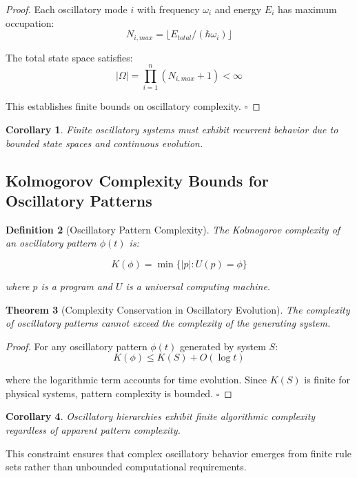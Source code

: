 \documentclass[11pt]{article}
\newtheorem{theorem}{Theorem}[section]
\newtheorem{corollary}[theorem]{Corollary}
\newtheorem{definition}[theorem]{Definition}
\theoremstyle{remark}
\begin{document}
\begin{proof}
Each oscillatory mode $i$ with frequency $\omega_i$ and energy $E_i$ has maximum occupation:
$$N_{i,max} = \lfloor E_{total}/(\hbar\omega_i) \rfloor$$

The total state space satisfies:
$$|\Omega| = \prod_{i=1}^{n} (N_{i,max} + 1) < \infty$$

This establishes finite bounds on oscillatory complexity. $\square$
\end{proof}

\begin{corollary}
Finite oscillatory systems must exhibit recurrent behavior due to bounded state spaces and continuous evolution.
\end{corollary}

\subsection{Kolmogorov Complexity Bounds for Oscillatory Patterns}

\begin{definition}[Oscillatory Pattern Complexity]
The Kolmogorov complexity of an oscillatory pattern $\phi(t)$ is:

$$K(\phi) = \min\{|p| : U(p) = \phi\}$$

where $p$ is a program and $U$ is a universal computing machine.
\end{definition}

\begin{theorem}[Complexity Conservation in Oscillatory Evolution]
The complexity of oscillatory patterns cannot exceed the complexity of the generating system.
\end{theorem}

\begin{proof}
For any oscillatory pattern $\phi(t)$ generated by system $S$:
$$K(\phi) \leq K(S) + O(\log t)$$

where the logarithmic term accounts for time evolution. Since $K(S)$ is finite for physical systems, pattern complexity is bounded. $\square$
\end{proof}

\begin{corollary}
Oscillatory hierarchies exhibit finite algorithmic complexity regardless of apparent pattern complexity.
\end{corollary}

This constraint ensures that complex oscillatory behavior emerges from finite rule sets rather than unbounded computational requirements.
\end{document}
